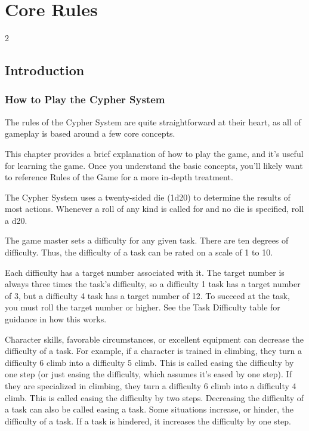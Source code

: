 \part{Core Rules}


\begin{multicols}{2}

\chapter{Introduction}

\section{How to Play the Cypher System}
The rules of the Cypher System are quite straightforward at their heart, as all of gameplay is based around a few core concepts.

This chapter provides a brief explanation of how to play the game, and it’s useful for learning the game. Once you understand the basic concepts, you’ll likely want to reference Rules of the Game for a more in-depth treatment. 

The Cypher System uses a twenty-sided die (1d20) to determine the results of most actions. Whenever a roll of any kind is called for and no die is specified, roll a d20.

The game master sets a difficulty for any given task. There are ten degrees of difficulty. Thus, the difficulty of a task can be rated on a scale of 1 to 10.

Each difficulty has a target number associated with it. The target number is always three times the task’s difficulty, so a difficulty 1 task has a target number of 3, but a difficulty 4 task has a target number of 12. To succeed at the task, you must roll the target number or higher. See the Task Difficulty table for guidance in how this works.

Character skills, favorable circumstances, or excellent equipment can decrease the difficulty of a task. For example, if a character is trained in climbing, they turn a difficulty 6 climb into a difficulty 5 climb. This is called easing the difficulty by one step (or just easing the difficulty, which assumes it’s eased by one step). If they are specialized in climbing, they turn a difficulty 6 climb into a difficulty 4 climb. This is called easing the difficulty by two steps. Decreasing the difficulty of a task can also be called easing a task. Some situations increase, or hinder, the difficulty of a task. If a task is hindered, it increases the difficulty by one step.


\end{multicols}
